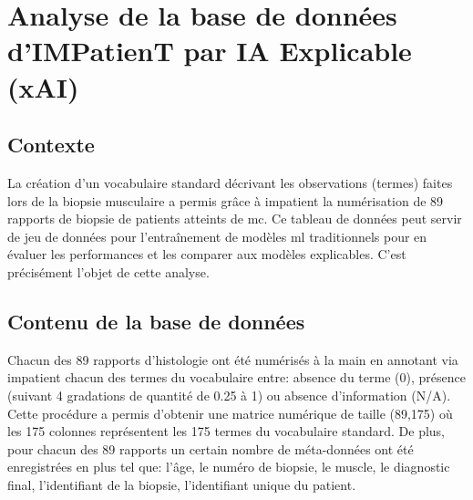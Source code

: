 \chapter{Analyse de la base de données d’IMPatienT par IA Explicable (xAI)}

\section{Contexte}
La création d'un vocabulaire standard décrivant les observations (termes) faites lors de la biopsie musculaire a permis grâce à \gls{impatient} la numérisation de 89 rapports de biopsie de patients atteints de \gls{mc}. Ce tableau de données peut servir de jeu de données pour l'entraînement de modèles \gls{ml} traditionnels pour en évaluer les performances et les comparer aux modèles explicables. C'est précisément l'objet de cette analyse.
\section{Contenu de la base de données}
Chacun des 89 rapports d'histologie ont été numérisés à la main en annotant via \gls{impatient} chacun des termes du vocabulaire entre: absence du terme (0), présence (suivant 4 gradations de quantité de 0.25 à 1) ou absence d'information (N/A).  Cette procédure a permis d'obtenir une matrice numérique de taille (89,175) où les 175 colonnes représentent les 175 termes du vocabulaire standard. De plus, pour chacun des 89 rapports un certain nombre de méta-données ont été enregistrées en plus tel que: l'âge, le numéro de biopsie, le muscle, le diagnostic final, l'identifiant de la biopsie, l'identifiant unique du patient.
